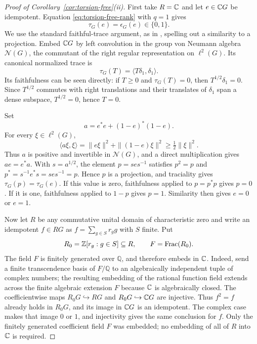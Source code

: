 \begin{proof}[Proof of Corollary~\ref{cor:torsion-free}\textup{(ii)}]
First take $R=\mathbb C$ and let $e\in\mathbb C G$ be idempotent. Equation
\eqref{eq:torsion-free-rank} with $q=1$ gives
\[
 \tau_G(e)=\epsilon_G(e)\in\{0,1\}.
\]
We use the standard faithful-trace argument, as in
\cite[Theorem 2.1 and Remark 2.2]{BV1998}, spelling out a similarity
to a projection. Embed $\mathbb C G$ by left convolution in the group von
Neumann algebra $\mathcal N(G)$, the commutant of the right regular
representation on $\ell^2(G)$. Its canonical normalized trace is
\[
 \tau_G(T)=\langle T\delta_1,\delta_1\rangle .
\]
Its faithfulness can be seen directly: if
$T\geq0$ and $\tau_G(T)=0$, then $T^{1/2}\delta_1=0$. Since $T^{1/2}$
commutes with right translations and their translates of $\delta_1$
span a dense subspace, $T^{1/2}=0$, hence $T=0$.

Set
\[
 a=e^*e+(1-e)^*(1-e).
\]
For every $\xi\in\ell^2(G)$,
\[
 \langle a\xi,\xi\rangle
 =\|e\xi\|^2+\|(1-e)\xi\|^2
 \geq \tfrac12\|\xi\|^2.
\]
Thus $a$ is positive and invertible in $\mathcal N(G)$, and a direct
multiplication gives $ae=e^*a$. With $s=a^{1/2}$, the element
$p=ses^{-1}$ satisfies $p^2=p$ and
$p^*=s^{-1}e^*s=ses^{-1}=p$. Hence $p$ is a projection, and
traciality gives $\tau_G(p)=\tau_G(e)$. If this value is zero,
faithfulness applied to $p=p^*p$ gives $p=0$. If it is one,
faithfulness applied to $1-p$ gives $p=1$. Similarity then gives
$e=0$ or $e=1$.

Now let $R$ be any commutative unital domain of characteristic zero
and write an idempotent $f\in RG$ as
$f=\sum_{g\in S}r_g g$ with $S$ finite. Put
\[
 R_0=\mathbb Z[r_g:g\in S]\subseteq R,\qquad F=\operatorname{Frac}(R_0).
\]
The field $F$ is finitely generated over $\mathbb Q$, and therefore
embeds in $\mathbb C$. Indeed, send a finite transcendence basis of
$F/\mathbb Q$ to an algebraically independent tuple of complex
numbers; the resulting embedding of the rational function field
extends across the finite algebraic extension $F$ because $\mathbb C$ is
algebraically closed. The coefficientwise maps
$R_0G\hookrightarrow RG$ and $R_0G\hookrightarrow\mathbb C G$ are injective.
Thus $f^2=f$ already holds in $R_0G$, and its image in $\mathbb C G$ is an
idempotent. The complex case makes that image $0$ or $1$, and
injectivity gives the same conclusion for $f$. Only the finitely
generated coefficient field $F$ was embedded; no embedding of all
of $R$ into $\mathbb C$ is required.
\end{proof}

